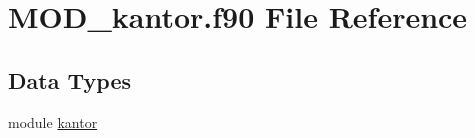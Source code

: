 \hypertarget{MOD__kantor_8f90}{\section{M\-O\-D\-\_\-kantor.\-f90 File Reference}
\label{MOD__kantor_8f90}
}
\subsection*{Data Types}
\begin{DoxyCompactItemize}
\item 
module \hyperlink{classkantor}{kantor}
\end{DoxyCompactItemize}
